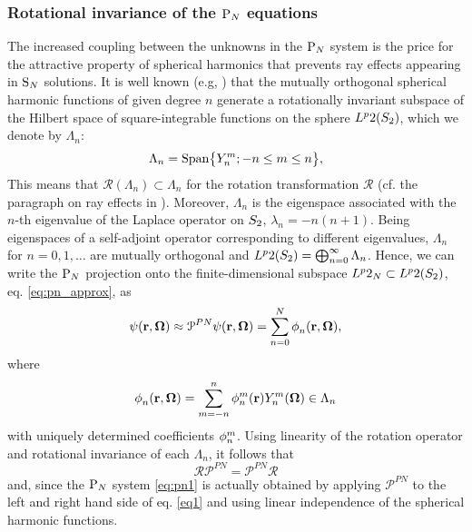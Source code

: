 \subsubsection{Rotational invariance of the $\PN$ equations}
The increased coupling between the unknowns in the $\PN$ system is the price for the attractive property of spherical
harmonics that prevents ray effects appearing in $\SN$ solutions. It is well known (e.g, \cite[Chap.3]{Sansone}) that
the mutually orthogonal spherical harmonic functions of given degree $n$ generate a rotationally invariant subspace of
the Hilbert space of square-integrable functions on the sphere $\Lp{2}(\Sphere)$, which we denote by $\Lambda_n$:
\begin{equation}
	\label{eq:subspace}
    	\Lambda_n = \mathrm{Span}\bigl\{\Y{n}{m}; -n \leq m \leq n\bigr\},
\end{equation}
This means that $\mathcal{R}(\Lambda_n) \subset \Lambda_n$ for the rotation transformation $\mathcal{R}$ (cf. the
paragraph on ray effects in ). Moreover, $\Lambda_n$ is the eigenspace associated with the $n$-th 
eigenvalue of the Laplace operator on $\Sphere$, $\lambda_n = -n(n+1)$. Being eigenspaces of a self-adjoint operator
corresponding to different eigenvalues, $\Lambda_n$ for $n=0,1,\ldots$ are mutually orthogonal and  
$\Lp{2}(\Sphere) = \bigoplus_{n=0}^{\infty}\Lambda_n$.
Hence, we can write the $\PN$ projection onto the finite-dimensional subspace $\Lp{2}_N\subset\Lp{2}(\Sphere)$, eq.
\eqref{eq:pn_approx}, as
\begin{equation}\label{eq:pn_approx2}
	\psi(\br,\bomega) \approx \mathcal{P}^{PN}\psi(\br,\bomega) = \suma[n]{0}{N}\angmom{n}{}(\br,\bomega),
\end{equation}
where 
$$
	\angmom{n}{}(\br,\bomega) = \suma[m]{-n}{n}\angmom{n}{m}(\br)\Y{n}{m}(\bomega) \in \Lambda_n
$$
with uniquely determined coefficients $\angmom{n}{m}$. Using linearity of the rotation operator and rotational
invariance of each $\Lambda_n$, it follows that 
$$
	\mathcal{R}\mathcal{P}^{PN} = \mathcal{P}^{PN}\mathcal{R}
$$
and, since the $\PN$ system \eqref{eq:pn1} is actually obtained by applying $\mathcal{P}^{PN}$ to the left and right
hand side of eq. \eqref{eq1} and using linear independence of the spherical harmonic functions. 

